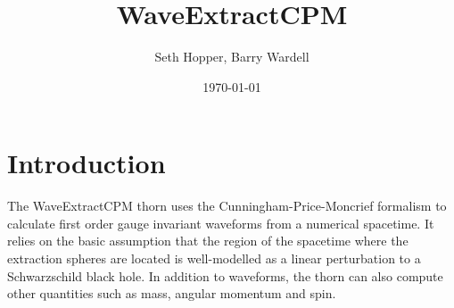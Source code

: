 \documentclass{article}
\begin{document}
\author{Seth Hopper, Barry Wardell}

\title{WaveExtractCPM}

\date{\today}

\maketitle


\def\a   {\alpha}
\def\b   {\beta}
\def\p   {\phi}
\def\t   {\theta}
\def\Y   {Y_{lm}}
\def\Ys  {Y^*_{lm}}
\def\Yt  {Y_{lm,\theta}}
\def\Ytt {Y_{lm,\theta\theta}}
\def\Ytp {Y_{lm,\theta\phi}}
\def\Yp  {Y_{lm,\phi}}
\def\Ypp {Y_{lm,\phi\phi}}
\def\Yz  {Y_{l0}}
\def\Yzt {Y_{l0,\theta}}
\def\Yztt{Y_{l0,\theta\theta}}
\def\c   {\cos\theta}
\def\s   {\sin\theta}

\newcommand{\bi}{\begin{itemize}}
\newcommand{\ei}{\end{itemize}}

\newcommand{\be}{\begin{equation}}
\newcommand{\ee}{\end{equation}}

\newcommand{\ba}{\begin{array}}
\newcommand{\ea}{\end{array}}

\renewcommand{\l}{\left(}
\renewcommand{\r}{\right)}
\renewcommand{\a}{\alpha}
\renewcommand{\b}{\beta}
\newcommand{\g}{\gamma}
\newcommand{\G}{\Gamma}
\renewcommand{\d}{\delta}
\newcommand{\D}{\Delta}
\newcommand{\e}{\epsilon}
\newcommand{\ve}{\varepsilon}
\newcommand{\La}{\Lambda}
\newcommand{\la}{\lambda}
\renewcommand{\O}{\Omega}
\renewcommand{\o}{\omega}
\renewcommand{\th}{\theta}
\newcommand{\Th}{\Theta}
\renewcommand{\q}{\quad}
\newcommand{\vp}{\varphi}

\newcommand{\pa}{\partial}
\newcommand{\bs}{\boldsymbol}
\newcommand{\exact}[1]{\mathsf{#1}}
\renewcommand{\Bar}[1]{\makebox{$\bar{#1}$}}


%
%
\section{Introduction}

The WaveExtractCPM thorn uses the Cunningham-Price-Moncrief formalism
\cite{cunningham78,cunningham79} to calculate first order gauge invariant waveforms from a
numerical spacetime. It relies on the basic assumption that the region of the spacetime where the
extraction spheres are located is well-modelled as a linear perturbation to a Schwarzschild black
hole. In addition to waveforms, the thorn can also compute other quantities such as mass, angular
momentum and spin.
\end{document}
